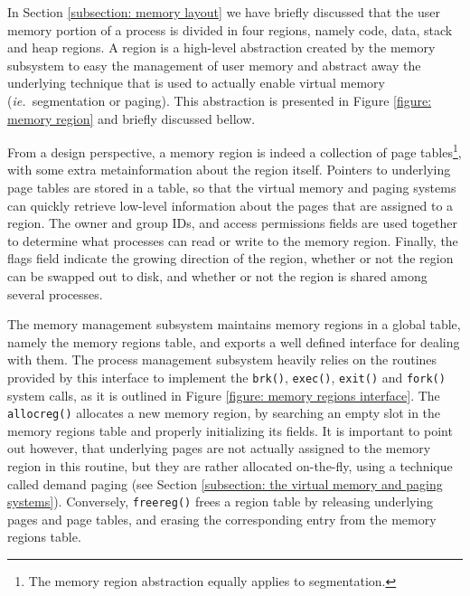 \documentclass[10pt,a4paper]{article}
\newcommand{\ie}{\textit{ie.\ }}
\begin{document}
In Section \ref{subsection: memory layout} we have briefly discussed that the user memory portion of a process is divided in four regions, namely code, data, stack and heap regions. A region is a high-level abstraction created by the memory subsystem to easy the management of user memory and abstract away the underlying technique that is used to actually enable virtual memory (\ie segmentation or paging). This abstraction is presented in Figure \ref{figure: memory region} and briefly discussed bellow.

From a design perspective, a memory region is indeed a collection of page tables\footnote{The memory region abstraction equally applies to segmentation.}, with some extra metainformation about the region itself. Pointers to underlying page tables are stored in a table, so that the virtual memory and paging systems can quickly retrieve low-level information about the pages that are assigned to a region. The owner and group IDs, and access permissions fields are used together to determine what processes can read or write to the memory region. Finally, the flags field indicate the growing direction of the region, whether or not the region can be swapped out to disk, and whether or not the region is shared among several processes.

The memory management subsystem maintains memory regions in a global table, namely the memory regions table, and exports a well defined interface for dealing with them. The process management subsystem heavily relies on the routines provided by this interface to implement the \texttt{brk()}, \texttt{exec()}, \texttt{exit()} and \texttt{fork()} system calls, as it is outlined in Figure \ref{figure: memory regions interface}. The \texttt{allocreg()} allocates a new memory region, by searching an empty slot in the memory regions table and properly initializing its fields. It is important to point out however, that underlying pages are not actually assigned to the memory region in this routine, but they are rather allocated on-the-fly, using a technique called demand paging (see Section \ref{subsection: the virtual memory and paging systems}). Conversely, \texttt{freereg()} frees a region table by releasing underlying pages and page tables, and erasing the corresponding entry from the memory regions table.
\end{document}
